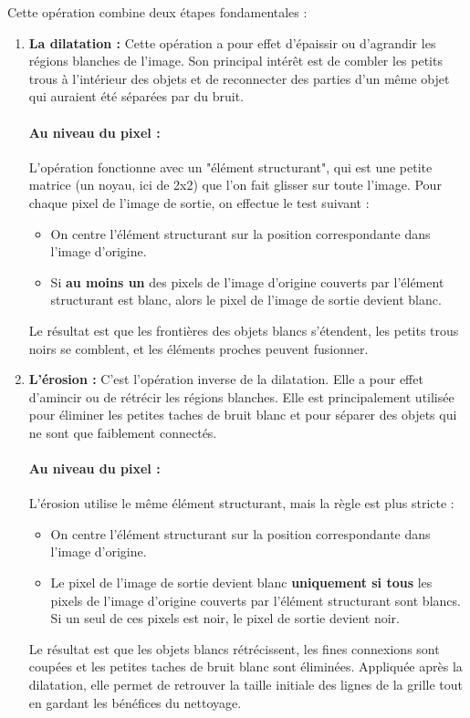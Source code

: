 \documentclass{article}
\begin{document}
Cette opération combine deux étapes fondamentales :
\begin{enumerate}
    \item \textbf{La dilatation :}
    Cette opération a pour effet d'épaissir ou d'agrandir les régions blanches de l'image. Son principal intérêt est de combler les petits trous à l'intérieur des objets et de reconnecter des parties d'un même objet qui auraient été séparées par du bruit.

    \paragraph{Au niveau du pixel :} L'opération fonctionne avec un "élément structurant", qui est une petite matrice (un noyau, ici de 2x2) que l'on fait glisser sur toute l'image. Pour chaque pixel de l'image de sortie, on effectue le test suivant :
    \begin{itemize}
        \item On centre l'élément structurant sur la position correspondante dans l'image d'origine.
        \item Si \textbf{au moins un} des pixels de l'image d'origine couverts par l'élément structurant est blanc, alors le pixel de l'image de sortie devient blanc.
    \end{itemize}
    Le résultat est que les frontières des objets blancs s'étendent, les petits trous noirs se comblent, et les éléments proches peuvent fusionner.

    \item \textbf{L'érosion :}
    C'est l'opération inverse de la dilatation. Elle a pour effet d'amincir ou de rétrécir les régions blanches. Elle est principalement utilisée pour éliminer les petites taches de bruit blanc et pour séparer des objets qui ne sont que faiblement connectés.

    \paragraph{Au niveau du pixel :} L'érosion utilise le même élément structurant, mais la règle est plus stricte :
    \begin{itemize}
        \item On centre l'élément structurant sur la position correspondante dans l'image d'origine.
        \item Le pixel de l'image de sortie devient blanc \textbf{uniquement si tous} les pixels de l'image d'origine couverts par l'élément structurant sont blancs. Si un seul de ces pixels est noir, le pixel de sortie devient noir.
    \end{itemize}
    Le résultat est que les objets blancs rétrécissent, les fines connexions sont coupées et les petites taches de bruit blanc sont éliminées. Appliquée après la dilatation, elle permet de retrouver la taille initiale des lignes de la grille tout en gardant les bénéfices du nettoyage.
\end{enumerate}
\end{document}
